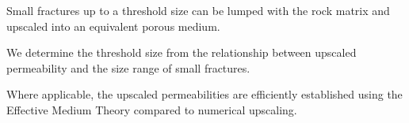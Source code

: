 \documentclass[draft]{agujournal2018}
\begin{document}




\begin{keypoints}
\item Small fractures up to a threshold size can be lumped with the rock matrix and upscaled into an equivalent porous medium.
\item We determine the threshold size from the relationship between upscaled permeability and the size range of small fractures.
\item Where applicable, the upscaled permeabilities are efficiently established using the Effective Medium Theory compared to numerical upscaling.
\end{keypoints}

%
%

\end{document}
